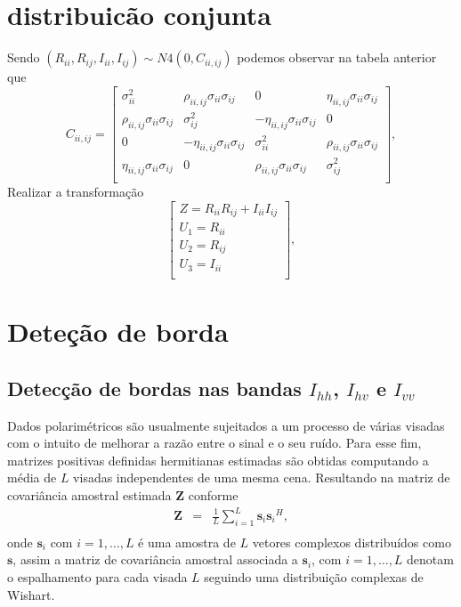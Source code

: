 \documentclass[conference]{IEEEtran}
\begin{document}
\section{distribuicão conjunta}
Sendo $(R_{ii}, R_{ij},I_{ii}, I_{ij})\sim N4(0, C_{ii,ij})$ podemos observar na tabela anterior que 
\begin{equation}
C_{ii,ij}=\left[
\begin{array}{cccc}
	\sigma_{ii}^2   &  \rho_{ii,ij}\sigma_{ii}\sigma_{ij} & 0&\eta_{ii,ij}\sigma_{ii}\sigma_{ij}\\
	\rho_{ii,ij}\sigma_{ii}\sigma_{ij} & \sigma_{ij}^2  & -\eta_{ii,ij}\sigma_{ii}\sigma_{ij}&0 \\
	0&-\eta_{ii,ij}\sigma_{ii}\sigma_{ij}&\sigma_{ii}^2&\rho_{ii,ij}\sigma_{ii}\sigma_{ij}\\
	\eta_{ii,ij}\sigma_{ii}\sigma_{ij}&0&\rho_{ii,ij}\sigma_{ii}\sigma_{ij}&\sigma_{ij}^2\\
\end{array}
\right],
\end{equation}
Realizar a transformação 
\begin{equation}
\left[
\begin{array}{ccc}
	 Z = R_{ii}R_{ij}+I_{ii}I_{ij} \\
	 U_1 = R_{ii}\\
	 U_2 = R_{ij}\\
	 U_3 = I_{ii}\\
\end{array}
\right],
\end{equation}
\section{Deteção de borda}
\subsection{Detecção de bordas nas bandas $I_{hh}$, $I_{hv}$ e $I_{vv}$}
Dados polarimétricos são usualmente sujeitados a um processo de várias visadas com o intuito de melhorar a razão entre o sinal e o seu ruído. Para esse fim, matrizes positivas definidas hermitianas estimadas são obtidas computando a média de $L$ visadas independentes de uma mesma cena. Resultando na matriz de covariância amostral estimada {\bf Z} conforme \cite{good, ade}
\begin{equation}
\begin{array}{ccc}
    \mathbf{Z}&=&\frac{1}{L}\displaystyle{\sum_{i=1}^{L} {\mathbf{s}_i}{\mathbf{s}_i}^H}, \\
\end{array}
\end{equation}
onde $\mathbf{s}_i$ com $i = 1, \dots, L$ é uma amostra de $\mathit{L}$ vetores complexos distribuídos como $\mathbf{s}$, assim a matriz de covariância amostral associada a $\mathbf{s}_i$, com $i=1,\dots,L$ denotam o espalhamento para cada visada $L$ seguindo uma distribuição complexas de Wishart. 
\end{document}
